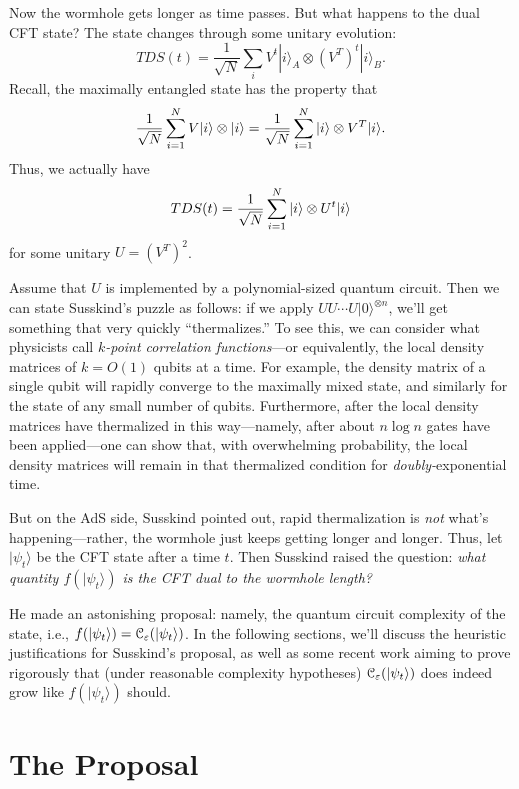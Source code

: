 \documentclass[11pt]{report}
\theoremstyle{plain}
\theoremstyle{definition}
\newcommand{\eps}{\varepsilon}
\renewcommand{\ket}[1]{|#1\rangle}
\begin{document}
Now the wormhole gets longer as time passes.  But what happens to the dual CFT state?  The state changes through some unitary evolution:
$$ TDS(t) = \frac{1}{\sqrt{N}}  \sum_i V^t \ket{i}_A \otimes  (V^T)^t \ket{i}_B. $$
Recall, the maximally entangled state has the property that
$$ \frac{1}{\sqrt{N}} \sum_{i=1}^N V \ket{i} \otimes \ket{i} = {1 \over \sqrt{N}} \sum_{i=1}^N \ket{i} \otimes V^T \ket{i}. $$
Thus, we actually have
$$ TDS(t) = {1 \over \sqrt{N}} \sum_{i=1}^N \ket{i} \otimes U^t \ket{i} $$
for some unitary $U = (V^T)^2$.

Assume that $U$ is implemented by a polynomial-sized quantum circuit.  Then we can state Susskind's puzzle as follows: if we apply $U U \cdots U \ket{0}^{\otimes n}$, we'll get something that very quickly ``thermalizes.''  To see this, we can consider what physicists call {\em $k$-point correlation functions}---or equivalently, the local density matrices of $k=O(1)$ qubits at a time.   For example, the density matrix of a single qubit will rapidly converge to the maximally mixed state, and similarly for the state of any small number of qubits.  Furthermore, after the local density matrices have thermalized in this way---namely, after about $n \log n$ gates have been applied---one can show that, with overwhelming probability, the local density matrices will remain in that thermalized condition for {\em doubly-}exponential time.

But on the AdS side, Susskind pointed out, rapid thermalization is {\it not} what's happening---rather, the wormhole just keeps getting longer and longer. Thus, let $\ket{\psi_t}$ be the CFT state after a time $t$.  Then Susskind raised the question: {\em what quantity $f(\ket{\psi_t})$ is the CFT dual to the wormhole length?}

He made an astonishing proposal: namely, the quantum circuit complexity of the state, i.e., $f(\ket{\psi_t}) = {\cal C}_{\eps} (\ket{\psi_t})$.  In the following sections, we'll discuss the heuristic justifications for Susskind's proposal, as well as some recent work aiming to prove rigorously that (under reasonable complexity hypotheses) ${\cal C}_{\eps} (\ket{\psi_t})$ does indeed grow like $f(\ket{\psi_t})$ should.

\section{The Proposal}
\end{document}
